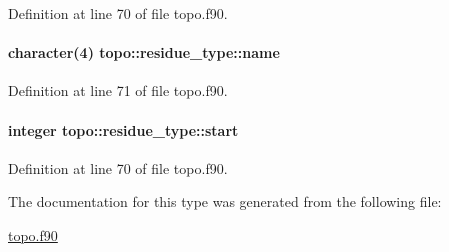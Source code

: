 Definition at line 70 of file topo.\-f90.

\hypertarget{structtopo_1_1residue__type_a76f46b255e12ee2ee6655582acf9e2e1}{
\paragraph[{name}]{\setlength{\rightskip}{0pt plus 5cm}character(4) topo\-::residue\-\_\-type\-::name}}\label{structtopo_1_1residue__type_a76f46b255e12ee2ee6655582acf9e2e1}


Definition at line 71 of file topo.\-f90.

\hypertarget{structtopo_1_1residue__type_a09643f047cc32e454c2d717141840380}{
\paragraph[{start}]{\setlength{\rightskip}{0pt plus 5cm}integer topo\-::residue\-\_\-type\-::start}}\label{structtopo_1_1residue__type_a09643f047cc32e454c2d717141840380}


Definition at line 70 of file topo.\-f90.



The documentation for this type was generated from the following file\-:\begin{DoxyCompactItemize}
\item 
\hyperlink{topo_8f90}{topo.\-f90}\end{DoxyCompactItemize}
